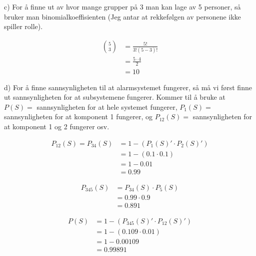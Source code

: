 \documentclass[12pt, a4paper]{article}
\begin{document}
\newpage

c) For å finne ut av hvor mange grupper på 3 man kan lage av 5 personer, så bruker man binomialkoeffisienten (Jeg antar at rekkefølgen av personene ikke spiller rolle).

\begin{equation}
    \begin{split}
        {5 \choose 3} &= \frac{5!}{3!(5-3)!} \\
                      &= \frac{5 \cdot 4}{2} \\
                      &= 10
    \end{split}
\end{equation}

d) For å finne sannsynligheten til at alarmsystemet fungerer, så må vi først finne ut sannsynligheten for at subsystemene fungerer. 
Kommer til å bruke at $P(S) =$ sannsynligheten for at hele systemet fungerer, $P_1(S) =$ sannsynligheten for at komponent 1 fungerer, og $P_{12}(S) =$ sannsynligheten for at komponent 1 og 2 fungerer osv.

\begin{equation}
    \begin{split}
        P_{12}(S) = P_{34}(S) &= 1 - (P_1(S)' \cdot P_2(S)') \\
        &= 1 - (0.1 \cdot 0.1) \\
        &= 1 - 0.01 \\
        &= 0.99        
    \end{split}
\end{equation}

\begin{equation}
    \begin{split}
        P_{345}(S) &= P_{34}(S) \cdot P_5(S) \\
                 &= 0.99 \cdot 0.9 \\
                 &= 0.891
    \end{split}
\end{equation}

\begin{equation}
    \begin{split}
        P(S) &= 1 - (P_{345}(S)' \cdot P_{12}(S)') \\ 
             &= 1 - (0.109 \cdot 0.01) \\
             &= 1 - 0.00109 \\
             &= 0.99891
    \end{split}
\end{equation}
\end{document}
